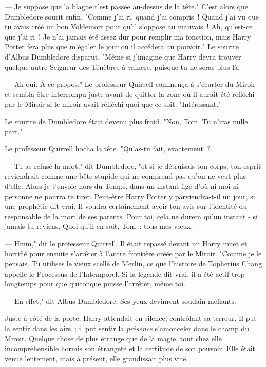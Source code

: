 --- Je suppose que la blague t'est passée au-dessus de la tête." C'est alors que Dumbledore sourit enfin. "Comme j'ai ri, quand j'ai compris~! Quand j'ai vu que tu avais créé un bon Voldemort pour qu'il s'oppose au mauvais~! Ah, qu'est-ce que j'ai ri~! Je n'ai jamais été assez dur pour remplir ma fonction, mais Harry Potter fera plus que m'égaler le jour où il accédera au pouvoir." Le sourire d'Albus Dumbledore disparut. "Même si j'imagine que Harry devra trouver quelque autre Seigneur des Ténèbres à vaincre, puisque tu ne seras plus là.

--- Ah oui. À ce propos." Le professeur Quirrell commença à s'écarter du Miroir et sembla être interrompu juste avant de quitter la zone où il aurait été réfléchi par le Miroir si le miroir avait réfléchi quoi que ce soit. "Intéressant."

Le sourire de Dumbledore était devenu plus froid. "Non, Tom. Tu n'iras nulle part."

Le professeur Quirrell hocha la tête. "Qu'as-tu fait, exactement~?

--- Tu as refusé la mort," dit Dumbledore, "et si je détruisais ton corps, ton esprit reviendrait comme une bête stupide qui ne comprend pas qu'on ne veut plus d'elle. Alors je t'envoie hors du Temps, dans un instant figé d'où ni moi ni personne ne pourra te tirer. Peut-être Harry Potter y parviendra-t-il un jour, si une prophétie dit vrai. Il voudra certainement avoir ton avis sur l'identité du responsable de la mort de ses parents. Pour toi, cela ne durera qu'un instant - si jamais tu reviens. Quoi qu'il en soit, Tom~: tous mes vœux.

--- Hmm," dit le professeur Quirrell. Il était repassé devant un Harry muet et horrifié pour ensuite s'arrêter à l'autre frontière créée par le Miroir. "Comme je le pensais. Tu utilises le vieux scellé de Merlin, ce que l'histoire de Topherius Chang appelle le Processus de l'Intemporel. Si la légende dit vrai, il a été actif trop longtemps pour que quiconque puisse l'arrêter, même toi.

--- En effet," dit Albus Dumbledore. Ses yeux devinrent soudain méfiants.

Juste à côté de la porte, Harry attendait en silence, contrôlant sa terreur. Il put la sentir dans les airs~; il put sentir la \emph{présence} s'amonceler dans le champ du Miroir. Quelque chose de plus étrange que de la magie, tout chez elle incompréhensible hormis son étrangeté et la certitude de son pouvoir. Elle était venue lentement, mais à présent, elle grandissait plus vite.

